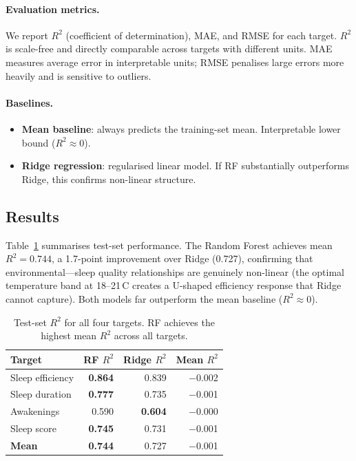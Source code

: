 \documentclass[11pt,a4paper,twocolumn]{article}
\begin{document}
\paragraph{Evaluation metrics.}
We report $R^2$ (coefficient of determination), MAE, and RMSE for each target.
$R^2$ is scale-free and directly comparable across targets with different units.
MAE measures average error in interpretable units; RMSE penalises large errors
more heavily and is sensitive to outliers.

\paragraph{Baselines.}
\begin{itemize}\setlength\itemsep{2pt}
  \item \textbf{Mean baseline}: always predicts the training-set mean.
        Interpretable lower bound ($R^2 \approx 0$).
  \item \textbf{Ridge regression}: regularised linear model.
        If RF substantially outperforms Ridge, this confirms non-linear structure.
\end{itemize}

\subsection{Results}

Table~\ref{tab:ml} summarises test-set performance.
The Random Forest achieves mean $R^2 = 0.744$, a 1.7-point improvement over
Ridge (0.727), confirming that environmental---sleep quality relationships
are genuinely non-linear (the optimal temperature band at 18--21\,\textdegree C
creates a U-shaped efficiency response that Ridge cannot capture).
Both models far outperform the mean baseline ($R^2 \approx 0$).

\begin{table}[h]
  \centering
  \small
  \caption{Test-set $R^2$ for all four targets.  RF achieves the highest
           mean $R^2$ across all targets.}
  \label{tab:ml}
  \begin{tabular}{lrrr}
    \toprule
    Target & RF $R^2$ & Ridge $R^2$ & Mean $R^2$ \\
    \midrule
    Sleep efficiency  & \textbf{0.864} & 0.839 & $-$0.002 \\
    Sleep duration    & \textbf{0.777} & 0.735 & $-$0.001 \\
    Awakenings        &          0.590 & \textbf{0.604} & $-$0.000 \\
    Sleep score       & \textbf{0.745} & 0.731 & $-$0.001 \\
    \midrule
    \textbf{Mean}     & \textbf{0.744} & 0.727 & $-$0.001 \\
    \bottomrule
  \end{tabular}
\end{table}
\end{document}
